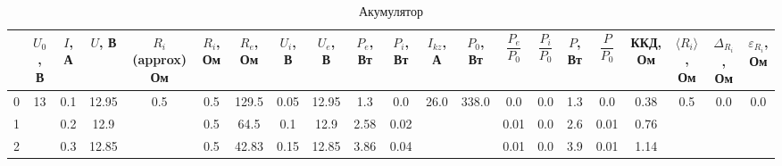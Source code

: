 \documentclass[a4paper,12pt]{article}
\begin{document}
\begin{table}[htp]
\begin{adjustwidth}{-2.2cm}{}
\label{table:accumulator}
	\caption{Акумулятор}
\begin{tabular}{|c|c|c|c|c|c|c|c|c|c|c|c|c|c|c|c|c|c|c|c|c|}
\hline
  & \makecell{$U_0$,\\  В} & \makecell{$I$, \\  А} & \makecell{$U$,\\  В} & \makecell{$R_i$ (approx)\\  Ом} & \makecell{$R_i$,\\  Ом} & \makecell{$R_e$,\\  Ом} & \makecell{$U_i$,\\  В} & \makecell{$U_e$,\\  В} & \makecell{$P_e$, \\  Вт} & \makecell{$P_i$, \\  Вт} & \makecell{$I_{kz}$,\\  А} &\makecell{ $P_0$, \\  Вт} & $\dfrac{P_e}{P_0}$ & $\dfrac{P_i}{P_0}$ & \makecell{$P$, \\  Вт} & $\dfrac{P}{P_0}$ & \makecell{ККД, \\  \textrm{ Ом}} & \makecell{$\langle R_i\rangle$, \\  Ом} & \makecell{$\Delta_{R_i}$, \\  \textrm{ Ом}} & \makecell{$\varepsilon_{R_i}$, \\  \textrm{ Ом}} \\ \hline0     & \multirow{20}{*}{13} & 0.1 & 12.95 & \multirow{20}{*}{0.5} & 0.5  & 129.5 & 0.05 & 12.95 & 1.3   & 0.0  & \multirow{20}{*}{26.0} & \multirow{20}{*}{338.0} & 0.0       & 0.0       & 1.3  & 0.0    & 0.38       & \multirow{20}{*}{0.5} & \multirow{20}{*}{0.0} & \multirow{20}{*}{0.0} \\ \cline{1-1} \cline{3-4} \cline{6-11} \cline{14-18}
1     &                      & 0.2 & 12.9  &                       & 0.5  & 64.5  & 0.1  & 12.9  & 2.58  & 0.02 &                        &                         & 0.01      & 0.0       & 2.6  & 0.01   & 0.76       &                       &                       &                       \\ \cline{1-1} \cline{3-4} \cline{6-11} \cline{14-18}
2     &                      & 0.3 & 12.85 &                       & 0.5  & 42.83 & 0.15 & 12.85 & 3.86  & 0.04 &                        &                         & 0.01      & 0.0       & 3.9  & 0.01   & 1.14       &                       &                       &                       \\ \cline{1-1} \cline{3-4} \cline{6-11} \cline{14-18}

\end{tabular}
\end{adjustwidth}
\end{table}
\end{document}
